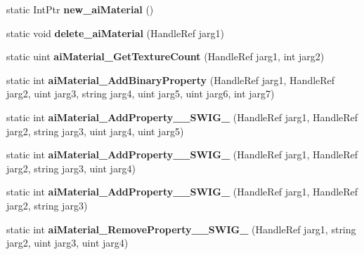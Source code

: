 \begin{DoxyCompactItemize}
\item 
\hypertarget{class_assimp_p_i_n_v_o_k_e_a1e886473800b9c6e4ca49d2ff2e60cf7}{static Int\+Ptr {\bfseries new\+\_\+ai\+Material} ()}\label{class_assimp_p_i_n_v_o_k_e_a1e886473800b9c6e4ca49d2ff2e60cf7}

\item 
\hypertarget{class_assimp_p_i_n_v_o_k_e_ae717d003c1d8777af711db234f0b5f7b}{static void {\bfseries delete\+\_\+ai\+Material} (Handle\+Ref jarg1)}\label{class_assimp_p_i_n_v_o_k_e_ae717d003c1d8777af711db234f0b5f7b}

\item 
\hypertarget{class_assimp_p_i_n_v_o_k_e_a087d30fbbfdbb72bb1a22c5a18e98565}{static uint {\bfseries ai\+Material\+\_\+\+Get\+Texture\+Count} (Handle\+Ref jarg1, int jarg2)}\label{class_assimp_p_i_n_v_o_k_e_a087d30fbbfdbb72bb1a22c5a18e98565}

\item 
\hypertarget{class_assimp_p_i_n_v_o_k_e_af2c1b35305d3f91f01f7875065e42a72}{static int {\bfseries ai\+Material\+\_\+\+Add\+Binary\+Property} (Handle\+Ref jarg1, Handle\+Ref jarg2, uint jarg3, string jarg4, uint jarg5, uint jarg6, int jarg7)}\label{class_assimp_p_i_n_v_o_k_e_af2c1b35305d3f91f01f7875065e42a72}

\item 
\hypertarget{class_assimp_p_i_n_v_o_k_e_ae20bcc9a9cc3fa2e2aa45ca2e524629d}{static int {\bfseries ai\+Material\+\_\+\+Add\+Property\+\_\+\+\_\+\+S\+W\+I\+G\+\_} (Handle\+Ref jarg1, Handle\+Ref jarg2, string jarg3, uint jarg4, uint jarg5)}\label{class_assimp_p_i_n_v_o_k_e_ae20bcc9a9cc3fa2e2aa45ca2e524629d}

\item 
\hypertarget{class_assimp_p_i_n_v_o_k_e_a62b864ff6fd02a21ec56f346bb76dbbc}{static int {\bfseries ai\+Material\+\_\+\+Add\+Property\+\_\+\+\_\+\+S\+W\+I\+G\+\_} (Handle\+Ref jarg1, Handle\+Ref jarg2, string jarg3, uint jarg4)}\label{class_assimp_p_i_n_v_o_k_e_a62b864ff6fd02a21ec56f346bb76dbbc}

\item 
\hypertarget{class_assimp_p_i_n_v_o_k_e_ad81e37359cc1df61fec53b95ee18a7b5}{static int {\bfseries ai\+Material\+\_\+\+Add\+Property\+\_\+\+\_\+\+S\+W\+I\+G\+\_} (Handle\+Ref jarg1, Handle\+Ref jarg2, string jarg3)}\label{class_assimp_p_i_n_v_o_k_e_ad81e37359cc1df61fec53b95ee18a7b5}

\item 
\hypertarget{class_assimp_p_i_n_v_o_k_e_a01bb066facc683ad99bdbd0389ed3b83}{static int {\bfseries ai\+Material\+\_\+\+Remove\+Property\+\_\+\+\_\+\+S\+W\+I\+G\+\_} (Handle\+Ref jarg1, string jarg2, uint jarg3, uint jarg4)}\label{class_assimp_p_i_n_v_o_k_e_a01bb066facc683ad99bdbd0389ed3b83}


\end{DoxyCompactItemize}
